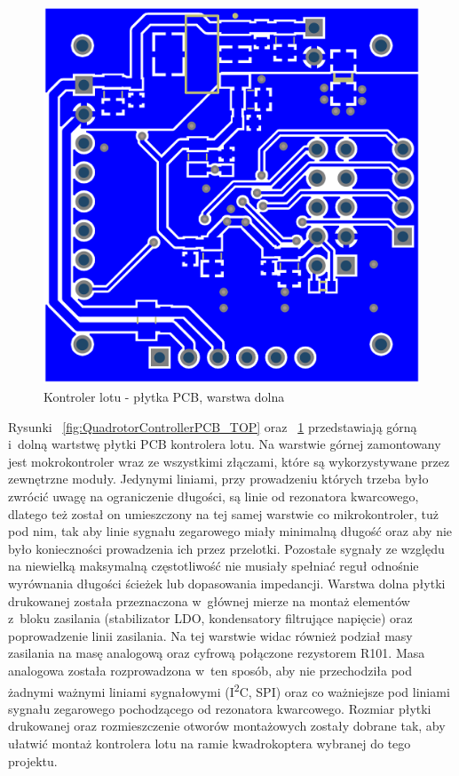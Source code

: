 \begin{figure}[H]
	\centering
	\includegraphics[scale=0.24]{Pictures/QuadrotorControllerPCB_Bottom.png}
		\caption[Kontroler lotu - płytka PCB, warstrwa dolna]{Kontroler lotu - płytka PCB, warstwa dolna}
	\label{fig:QuadrotorControllerPCB_Bottom}
\end{figure}

Rysunki ~\ref{fig:QuadrotorControllerPCB_TOP} oraz ~\ref{fig:QuadrotorControllerPCB_Bottom} przedstawiają górną i~dolną wartstwę płytki PCB kontrolera lotu. Na warstwie górnej zamontowany jest mokrokontroler wraz ze wszystkimi złączami, które są wykorzystywane przez zewnętrzne moduły. Jedynymi liniami, przy prowadzeniu których trzeba było zwrócić uwagę na ograniczenie długości, są linie od rezonatora kwarcowego, dlatego też został on umieszczony na tej samej warstwie co mikrokontroler, tuż pod nim, tak aby linie sygnału zegarowego miały minimalną długość oraz aby nie było konieczności prowadzenia ich przez przelotki. Pozostałe sygnały ze względu na niewielką maksymalną częstotliwość nie musiały spełniać reguł odnośnie wyrównania długości ścieżek lub dopasowania impedancji. Warstwa dolna płytki drukowanej została przeznaczona w~głównej mierze na montaż elementów z~bloku zasilania (stabilizator LDO, kondensatory filtrujące napięcie) oraz poprowadzenie linii zasilania. Na tej warstwie widac również podział masy zasilania na masę analogową oraz cyfrową połączone rezystorem R101. Masa analogowa została rozprowadzona w~ten sposób, aby nie przechodziła pod żadnymi ważnymi liniami sygnałowymi (I\textsuperscript{2}C, SPI) oraz co ważniejsze pod liniami sygnału zegarowego pochodzącego od rezonatora kwarcowego. Rozmiar płytki drukowanej oraz rozmieszczenie otworów montażowych zostały dobrane tak, aby ułatwić montaż kontrolera lotu na ramie kwadrokoptera wybranej do tego projektu.


